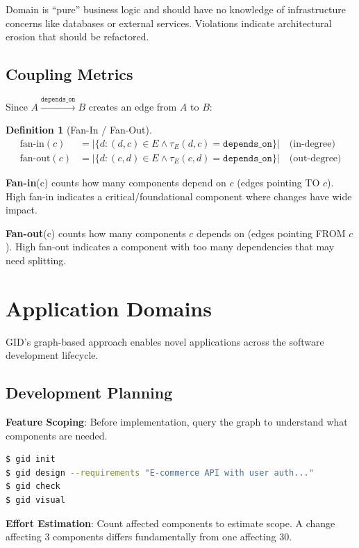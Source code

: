 \documentclass[11pt,a4paper]{article}
\newtheorem{definition}{Definition}
\begin{document}
Domain is ``pure'' business logic and should have no knowledge of infrastructure concerns like databases or external services. Violations indicate architectural erosion that should be refactored.

\subsection{Coupling Metrics}

Since $A \xrightarrow{\texttt{depends\_on}} B$ creates an edge from $A$ to $B$:

\begin{definition}[Fan-In / Fan-Out]
\begin{align*}
\text{fan-in}(c) &= |\{d : (d, c) \in E \land \tau_E(d, c) = \texttt{depends\_on}\}| \quad \text{(in-degree)} \\
\text{fan-out}(c) &= |\{d : (c, d) \in E \land \tau_E(c, d) = \texttt{depends\_on}\}| \quad \text{(out-degree)}
\end{align*}
\end{definition}

\textbf{Fan-in}(c) counts how many components depend on $c$ (edges pointing TO $c$). High fan-in indicates a critical/foundational component where changes have wide impact.

\textbf{Fan-out}(c) counts how many components $c$ depends on (edges pointing FROM $c$). High fan-out indicates a component with too many dependencies that may need splitting.

\section{Application Domains}

GID's graph-based approach enables novel applications across the software development lifecycle.

\subsection{Development Planning}

\textbf{Feature Scoping}: Before implementation, query the graph to understand what components are needed.

\begin{lstlisting}[language=bash]
$ gid init
$ gid design --requirements "E-commerce API with user auth..."
$ gid check
$ gid visual
\end{lstlisting}

\textbf{Effort Estimation}: Count affected components to estimate scope. A change affecting 3 components differs fundamentally from one affecting 30.
\end{document}
